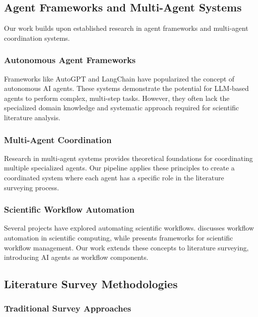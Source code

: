 \subsection{Agent Frameworks and Multi-Agent Systems}

Our work builds upon established research in agent frameworks and multi-agent coordination systems.

\subsubsection{Autonomous Agent Frameworks}

Frameworks like AutoGPT \cite{significant2023autogpt} and LangChain \cite{langchain2022} have popularized the concept of autonomous AI agents. These systems demonstrate the potential for LLM-based agents to perform complex, multi-step tasks. However, they often lack the specialized domain knowledge and systematic approach required for scientific literature analysis.

\subsubsection{Multi-Agent Coordination}

Research in multi-agent systems \cite{wooldridge2009introduction} provides theoretical foundations for coordinating multiple specialized agents. Our pipeline applies these principles to create a coordinated system where each agent has a specific role in the literature surveying process.

\subsubsection{Scientific Workflow Automation}

Several projects have explored automating scientific workflows. \cite{gil2011workflow} discusses workflow automation in scientific computing, while \cite{deelman2015pegasus} presents frameworks for scientific workflow management. Our work extends these concepts to literature surveying, introducing AI agents as workflow components.

\subsection{Literature Survey Methodologies}

\subsubsection{Traditional Survey Approaches}


